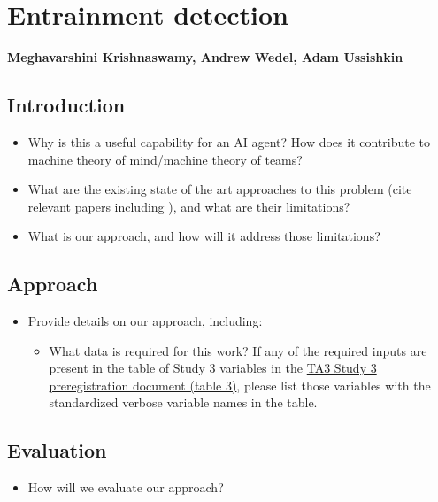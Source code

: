 \chapter{Entrainment detection}
\textbf{Meghavarshini Krishnaswamy, Andrew Wedel, Adam Ussishkin}
\section{Introduction}
\begin{itemize}
    \item Why is this a useful capability for an AI
        agent? How does it contribute to machine theory of mind/machine theory
        of teams?
    \item What are the existing state of the art approaches to this problem
        (cite relevant papers including \textcite{Rahimi_Litman_2020}), and what are their limitations? 
    \item What is our approach, and how will it address those limitations?
\end{itemize}

\section{Approach}
\begin{itemize}
    \item Provide details on our approach, including:
        \begin{itemize}
            \item What data is required for this work? If any of the required
                inputs are present in the table of Study 3 variables in the
                \href{https://docs.google.com/document/d/1GF7VsNF9R95IAaj6mVZUDV2mAX5ok1Bh6Tcm8zDpIkg/edit#heading=h.1ksv4uv}{TA3
                Study 3 preregistration document (table 3)}, please list those
                variables with the standardized verbose variable names in the table.
        \end{itemize}
\end{itemize}

\section{Evaluation}
\begin{itemize}
    \item How will we evaluate our approach?
\end{itemize}
